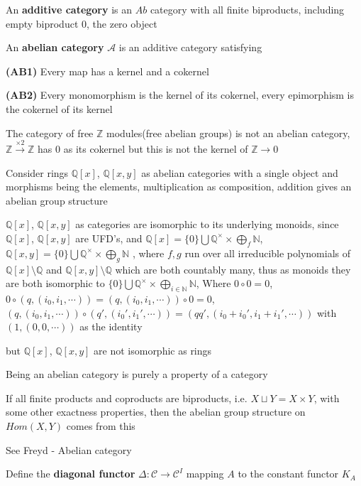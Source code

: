 \documentclass[../main.tex]{subfiles}
\begin{document}
\begin{definition}
An \textbf{additive category} is an $Ab$ category with all finite biproducts, including empty biproduct $0$, the zero object
\end{definition}

\begin{definition}
An \textbf{abelian category} $\mathscr A$ is an additive category satisfying \par
\textbf{(AB1) }Every map has a kernel and a cokernel \par
\textbf{(AB2) }Every monomorphism is the kernel of its cokernel, every epimorphism is the cokernel of its kernel
\end{definition}

\begin{example}
The category of free $\mathbb Z$ modules(free abelian groups) is not an abelian category, $\mathbb Z\xrightarrow{\times2}\mathbb Z$ has $0$ as its cokernel but this is not the kernel of $\mathbb Z\to0$
\end{example}

\begin{example}
Consider rings $\mathbb Q[x]$, $\mathbb Q[x,y]$ as abelian categories with a single object and morphisms being the elements, multiplication as composition, addition gives an abelian group structure \par
$\mathbb Q[x]$, $\mathbb Q[x,y]$ as categories are isomorphic to its underlying monoids, since $\mathbb Q[x]$, $\mathbb Q[x,y]$ are UFD's, and $\mathbb Q[x]=\{0\}\bigcup\mathbb Q^\times\times\bigoplus_f\mathbb N$, $\mathbb Q[x,y]=\{0\}\bigcup\mathbb Q^\times\times\bigoplus_g\mathbb N$ , where $f,g$ run over all irreducible polynomials of $\mathbb Q[x]\setminus\mathbb Q$ and $\mathbb Q[x,y]\setminus\mathbb Q$ which are both countably many, thus as monoids they are both isomorphic to $\{0\}\bigcup\mathbb Q^\times\times\bigoplus_{i\in\mathbb N}\mathbb N$, Where $0\circ0=0$, $0\circ(q,(i_0,i_1,\cdots))=(q,(i_0,i_1,\cdots))\circ0=0$, $(q,(i_0,i_1,\cdots))\circ(q',(i_0',i_1',\cdots))=(qq',(i_0+i_0',i_1+i_1',\cdots))$ with $(1,(0,0,\cdots))$ as the identity \par
but $\mathbb Q[x]$, $\mathbb Q[x,y]$ are not isomorphic as rings
\end{example}

\begin{remark}
Being an abelian category is purely a property of a category \par
If all finite products and coproducts are biproducts, i.e. $X\sqcup Y=X\times Y$, with some other exactness properties, then the abelian group structure on $Hom(X,Y)$ comes from this \par
See Freyd - Abelian category
\end{remark}

\begin{definition}
Define the \textbf{diagonal functor} $\Delta:\mathscr C\to\mathscr C^I$ mapping $A$ to the constant functor $K_A$
\end{definition}
\end{document}
